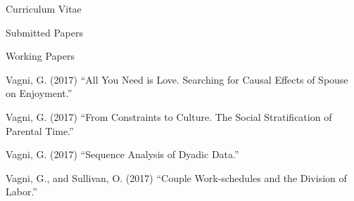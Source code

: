 \documentclass[12pt,a4paper]{article}
\begin{document}
\begin{cv}{Curriculum Vitae}
\begin{cvlist}{Submitted Papers}
 \end{cvlist}

  \begin{cvlist}{Working Papers}

  	\item Vagni, G. (2017) ``All You Need is Love. Searching for Causal Effects of Spouse on Enjoyment.'' 
  	\item Vagni, G. (2017)  ``From Constraints to Culture. The Social Stratification of Parental Time.'' 
  	 \item Vagni, G. (2017)  ``Sequence Analysis of Dyadic Data.'' 

  	\item Vagni, G., and Sullivan, O. (2017)  ``Couple Work-schedules and the Division of Labor.''
  	\end{cvlist}

  \date{~June~2017}
\end{cv}
\end{document}
